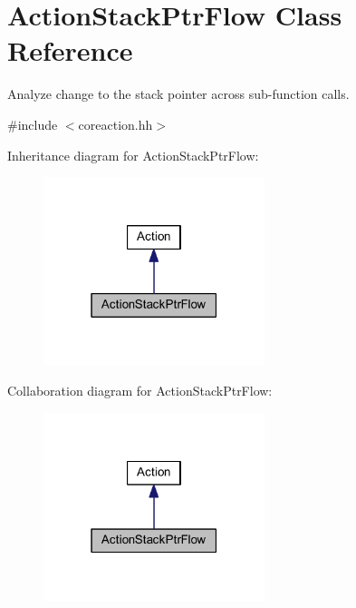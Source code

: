 \hypertarget{class_action_stack_ptr_flow}{}\section{Action\+Stack\+Ptr\+Flow Class Reference}
\label{class_action_stack_ptr_flow}


Analyze change to the stack pointer across sub-\/function calls.  




{\ttfamily \#include $<$coreaction.\+hh$>$}



Inheritance diagram for Action\+Stack\+Ptr\+Flow\+:
\nopagebreak
\begin{figure}[H]
\begin{center}
\leavevmode
\includegraphics[width=183pt]{class_action_stack_ptr_flow__inherit__graph}
\end{center}
\end{figure}


Collaboration diagram for Action\+Stack\+Ptr\+Flow\+:
\nopagebreak
\begin{figure}[H]
\begin{center}
\leavevmode
\includegraphics[width=183pt]{class_action_stack_ptr_flow__coll__graph}
\end{center}
\end{figure}
